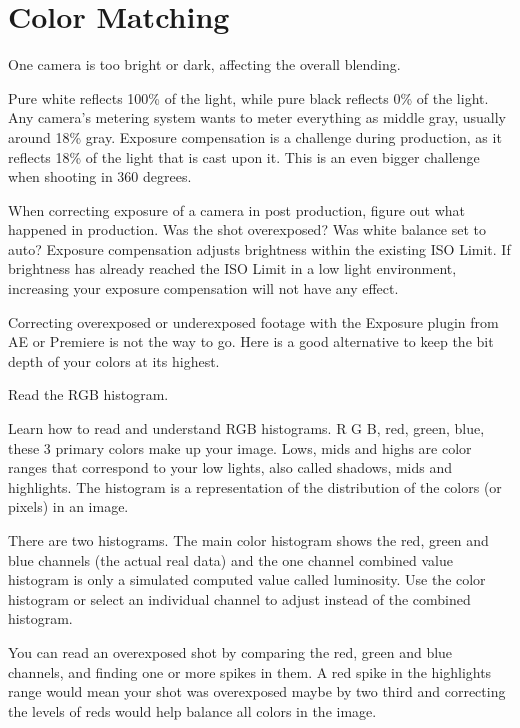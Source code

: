 \chapter{Color Matching}
\pagecolor{white}
\label{chap:32}
\begin{fullwidth}


\problem

{\large One camera is too bright or dark, affecting the overall blending. \par}

Pure white reflects 100\% of the light, while pure black reflects 0\% of the light. Any camera’s metering system wants to meter everything as middle gray, usually around 18\% gray. Exposure compensation is a challenge during production, as it reflects 18\% of the light that is cast upon it. This is an even bigger challenge when shooting in 360 degrees. 

When correcting exposure of a camera in post production, figure out what happened in production. Was the shot overexposed? Was white balance set to auto? Exposure compensation adjusts brightness within the existing ISO Limit. If brightness has already reached the ISO Limit in a low light environment, increasing your exposure compensation will not have any effect.

Correcting overexposed or underexposed footage with the Exposure plugin from AE or Premiere is not the way to go. Here is a good alternative to keep the bit depth of your colors at its highest.

\solution

{\large Read the RGB histogram. \par}

Learn how to read and understand RGB histograms. R G B, red, green, blue, these 3 primary colors make up your image. Lows, mids and highs are color ranges that correspond to your low lights, also called shadows, mids and highlights. The histogram is a representation of the distribution of the colors (or pixels) in an image. 

There are two histograms. The main color histogram shows the red, green and blue channels (the actual real data) and the one channel combined value histogram is only a simulated computed value called luminosity. Use the color histogram or select an individual channel to adjust instead of the combined histogram.

You can read an overexposed shot by comparing the red, green and blue channels, and finding one or more spikes in them. A red spike in the highlights range would mean your shot was overexposed maybe by two third and correcting the levels of reds would help balance all colors in the image.


\end{fullwidth}
